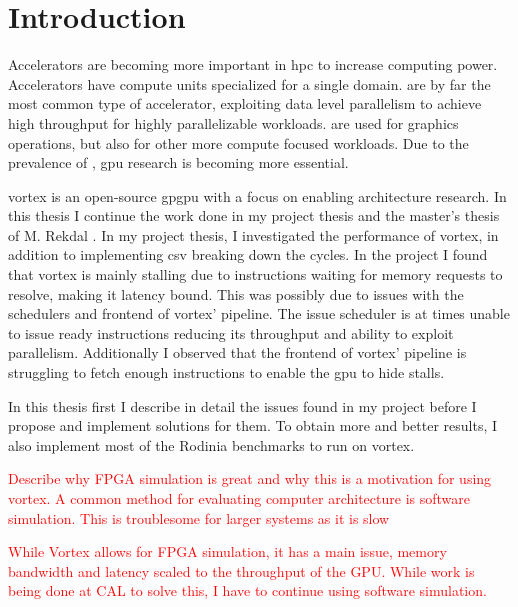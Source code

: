 \chapter{Introduction}

Accelerators are becoming more important in \acrfull{hpc} to increase computing power. Accelerators have compute units specialized for a single domain.  are by far the most common type of accelerator, exploiting data level parallelism to achieve high throughput for highly parallelizable workloads.  are used for graphics operations, but also for other more compute focused workloads.
Due to the prevalence of , \acrshort{gpu} research is becoming more essential.


\Gls{vortex} is an open-source \acrshort{gpgpu} with a focus on enabling architecture research. In this thesis I continue the work done in my project thesis \cite{Aurud_Project} and the master's thesis of M. Rekdal \cite{Rekdal_Master}. In my project thesis\cite{Aurud_Project}, I investigated the performance of \Gls{vortex}, in addition to implementing \acrfull{csv} breaking down the cycles. In the project I found that \Gls{vortex} is mainly stalling due to instructions waiting for memory requests to resolve, making it latency bound. This was possibly due to issues with the schedulers and frontend of \Gls{vortex}' pipeline. The issue scheduler is at times unable to issue ready instructions reducing its throughput and ability to exploit parallelism. Additionally I observed that the frontend of \Gls{vortex}' pipeline is struggling to fetch enough instructions to enable the \acrshort{gpu} to hide stalls.

In this thesis first I describe in detail the issues found in my project before I propose and implement solutions for them. To obtain more and better results, I also implement most of the Rodinia benchmarks to run on \Gls{vortex}.  

\textcolor{red}{Describe why FPGA simulation is great and why this is a motivation for using vortex. A common method for evaluating computer architecture is software simulation. This is troublesome for larger systems as it is slow}

\textcolor{red}{While Vortex allows for FPGA simulation, it has a main issue, memory bandwidth and latency scaled to the throughput of the GPU. While work is being done at CAL to solve this, I have to continue using software simulation. }

